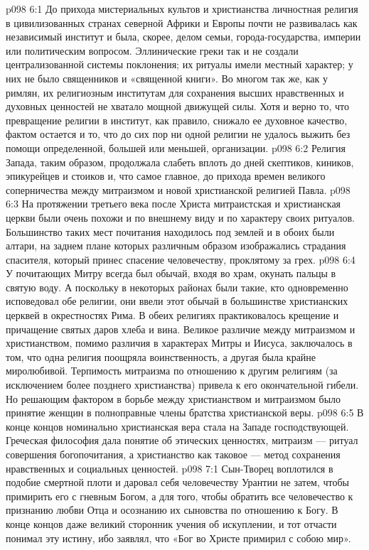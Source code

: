\vs p098 6:1 До прихода мистериальных культов и христианства личностная религия в цивилизованных странах северной Африки и Европы почти не развивалась как независимый институт и была, скорее, делом семьи, города\hyp{}государства, империи или политическим вопросом. Эллинические греки так и не создали централизованной системы поклонения; их ритуалы имели местный характер; у них не было священников и «священной книги». Во многом так же, как у римлян, их религиозным институтам для сохранения высших нравственных и духовных ценностей не хватало мощной движущей силы. Хотя и верно то, что превращение религии в институт, как правило, снижало ее духовное качество, фактом остается и то, что до сих пор ни одной религии не удалось выжить без помощи определенной, большей или меньшей, организации.
\vs p098 6:2 Религия Запада, таким образом, продолжала слабеть вплоть до дней скептиков, киников, эпикурейцев и стоиков и, что самое главное, до прихода времен великого соперничества между митраизмом и новой христианской религией Павла.
\vs p098 6:3 \pc На протяжении третьего века после Христа митраистская и христианская церкви были очень похожи и по внешнему виду и по характеру своих ритуалов. Большинство таких мест почитания находилось под землей и в обоих были алтари, на заднем плане которых различным образом изображались страдания спасителя, который принес спасение человечеству, проклятому за грех.
\vs p098 6:4 У почитающих Митру всегда был обычай, входя во храм, окунать пальцы в святую воду. А поскольку в некоторых районах были такие, кто одновременно исповедовал обе религии, они ввели этот обычай в большинстве христианских церквей в окрестностях Рима. В обеих религиях практиковалось крещение и причащение святых даров хлеба и вина. Великое различие между митраизмом и христианством, помимо различия в характерах Митры и Иисуса, заключалось в том, что одна религия поощряла воинственность, а другая была крайне миролюбивой. Терпимость митраизма по отношению к другим религиям (за исключением более позднего христианства) привела к его окончательной гибели. Но решающим фактором в борьбе между христианством и митраизмом было принятие женщин в полноправные члены братства христианской веры.
\vs p098 6:5 \pc В конце концов номинально христианская вера стала на Западе господствующей. Греческая философия дала понятие об этических ценностях, митраизм --- ритуал совершения богопочитания, а христианство как таковое --- метод сохранения нравственных и социальных ценностей.
\vs p098 7:1 Сын\hyp{}Творец воплотился в подобие смертной плоти и даровал себя человечеству Урантии не затем, чтобы примирить его с гневным Богом, а для того, чтобы обратить все человечество к признанию любви Отца и осознанию их сыновства по отношению к Богу. В конце концов даже великий сторонник учения об искуплении, и тот отчасти понимал эту истину, ибо заявлял, что «Бог во Христе примирил с собою мир».
